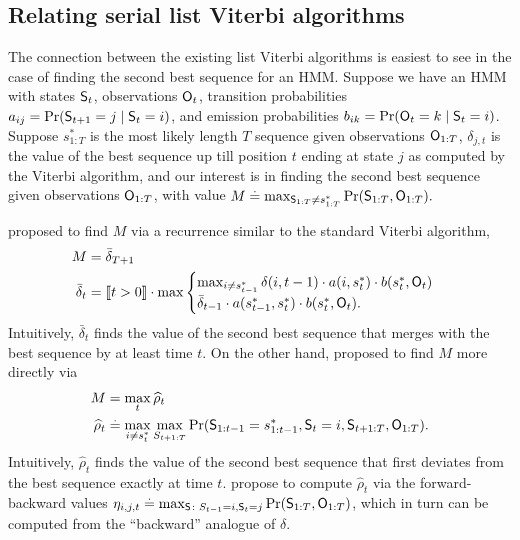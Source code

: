 %
\subsection{Relating serial list Viterbi algorithms}

The connection between the existing list Viterbi algorithms is easiest to see in the case of finding the second best sequence for an HMM.
Suppose we have an HMM with states $\mathsf{S}_{t}$, observations $\mathsf{O}_{t}$, transition probabilities $a_{ij} = \Pr( \mathsf{S}_{t+1} = j \mid \mathsf{S}_t = i )$, and emission probabilities $b_{ik} = \Pr( \mathsf{O}_{t} = k \mid \mathsf{S}_t = i )$.
Suppose $s^*_{1:T}$ is the most likely length $T$ sequence given observations $\mathsf{O}_{1:T}$,
$\delta_{j, t}$ is the value of the best sequence up till position $t$ ending at state $j$ as computed by the Viterbi algorithm,
and our interest is in finding the second best sequence given observations $\mathsf{O}_{1:T}$, with value
$ M \stackrel{.}{=} \max_{\mathsf{S}_{1:T} \neq s^*_{1 : T}}{\Pr( \mathsf{S}_{1:T}, \mathsf{O}_{1:T} )}. $

\citet{seshadri1994list} proposed to find $M$ via a recurrence similar to the standard Viterbi algorithm,
\begin{equation}
    \label{eqn:att-recurrence}
    \begin{aligned}
        M &= \bar{\delta}_{T+1} \\
        \bar{\delta}_t &= 
        \indicator{t > 0} \cdot
        \max
        \begin{cases}
        \max_{i \neq s^*_{t-1}} \delta(i, t-1) \cdot a( i, s^*_{t} ) \cdot b( s^*_{t}, \OSf_{t} ) \\
        \bar{\delta}_{t - 1} \cdot a( s^*_{t - 1}, s^*_{t} ) \cdot b( s^*_{t}, \OSf_{t} ).
        \end{cases}%
    \end{aligned}    
\end{equation}
Intuitively, $\bar{\delta}_t$ finds the value of the second best sequence that merges with the best sequence by at least time $t$.
On the other hand, \citet{nilsson2001sequentially} proposed to find $M$ more directly via
\begin{align*}
	M &= \max_t \widehat{\rho}_t \\
	\widehat{\rho}_{t} &\stackrel{.}{=} \max_{i \neq s^*_{t}} \max_{S_{t+1:T}} {\Pr( \mathsf{S}_{1:t-1} = s^*_{1:t-1}, \mathsf{S}_t = i, \mathsf{S}_{t+1:T}, \mathsf{O}_{1:T} )}.
\end{align*}
Intuitively, $\widehat{\rho}_t$ finds the value of the second best sequence that first deviates from the best sequence exactly at time $t$.
\citet{nilsson2001sequentially} propose to compute $\widehat{\rho}_{t}$ via the forward-backward values $\eta_{i, j, t} \stackrel{.}{=} \max_{\mathsf{S} \colon S_{t - 1} = i, \mathsf{S}_{t} = j} \Pr( \mathsf{S}_{1:T}, \mathsf{O}_{1:T} )$,
which in turn can be computed from the ``backward'' analogue of $\delta$.

